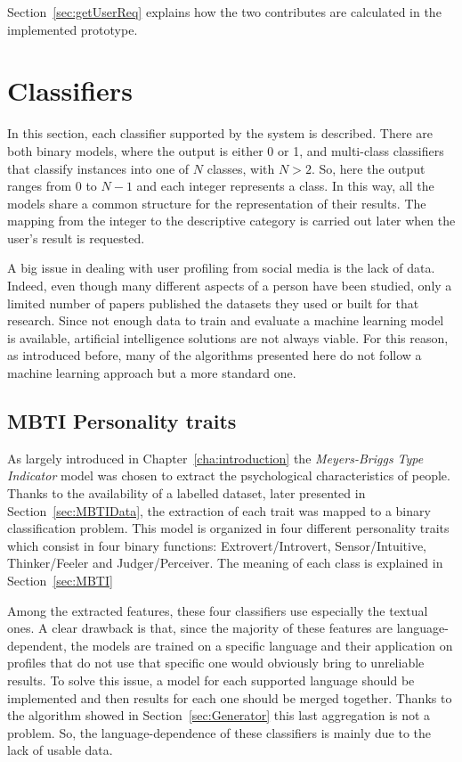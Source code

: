 Section~\ref{sec:getUserReq} explains how the two contributes are calculated in the implemented prototype.

\section{Classifiers}

\label{sec:Classifiers}

In this section, each classifier supported by the system is described. There are both binary models, where the output is either 0 or 1, and multi-class classifiers that classify instances into one of $N$ classes, with $N>2$. So, here the output ranges from 0 to $N-1$ and each integer represents a class.
In this way, all the models share a common structure for the representation of their results. The mapping from the integer to the descriptive category is carried out later when the user's result is requested.

A big issue in dealing with user profiling from social media is the lack of data. Indeed, even though many different aspects of a person have been studied, only a limited number of papers published the datasets they used or built for that research.
Since not enough data to train and evaluate a machine learning model is available, artificial intelligence solutions are not always viable.
For this reason, as introduced before, many of the algorithms presented here do not follow a machine learning approach but a more standard one.

\subsection{MBTI Personality traits}
As largely introduced in Chapter~\ref{cha:introduction} the \textit{Meyers-Briggs Type Indicator} model was chosen to extract the psychological characteristics of people.
Thanks to the availability of a labelled dataset, later presented in Section~\ref{sec:MBTIData}, the extraction of each trait was mapped to a binary classification problem.
This model is organized in four different personality traits which consist in four binary functions: Extrovert/Introvert, Sensor/Intuitive, Thinker/Feeler and Judger/Perceiver. The meaning of each class is explained in Section~\ref{sec:MBTI}

Among the extracted features, these four classifiers use especially the textual ones.
A clear drawback is that, since the majority of these features are language-dependent, the models are trained on a specific language and their application on profiles that do not use that specific one would obviously bring to unreliable results.
To solve this issue, a model for each supported language should be implemented and then results for each one should be merged together. Thanks to the algorithm showed in Section~\ref{sec:Generator} this last aggregation is not a problem.
So, the language-dependence of these classifiers is mainly due to the lack of usable data.

